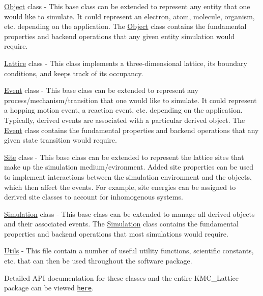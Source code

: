 \hyperlink{class_object}{Object} class -\/ This base class can be extended to represent any entity that one would like to simulate. It could represent an electron, atom, molecule, organism, etc. depending on the application. The \hyperlink{class_object}{Object} class contains the fundamental properties and backend operations that any given entity simulation would require.

\hyperlink{class_lattice}{Lattice} class -\/ This class implements a three-\/dimensional lattice, its boundary conditions, and keeps track of its occupancy.

\hyperlink{class_event}{Event} class -\/ This base class can be extended to represent any process/mechanism/transition that one would like to simulate. It could represent a hopping motion event, a reaction event, etc. depending on the application. Typically, derived events are associated with a particular derived object. The \hyperlink{class_event}{Event} class contains the fundamental properties and backend operations that any given state transition would require.

\hyperlink{class_site}{Site} class -\/ This base class can be extended to represent the lattice sites that make up the simulation medium/evironment. Added site properties can be used to implement interactions between the simulation environment and the objects, which then affect the events. For example, site energies can be assigned to derived site classes to account for inhomogenous systems.

\hyperlink{class_simulation}{Simulation} class -\/ This base class can be extended to manage all derived objects and their associated events. The \hyperlink{class_simulation}{Simulation} class contains the fundamental properties and backend operations that most simulations would require.

\hyperlink{namespace_utils}{Utils} -\/ This file contain a number of useful utility functions, scientific constants, etc. that can then be used throughout the software package.

Detailed A\+PI documentation for these classes and the entire K\+M\+C\+\_\+\+Lattice package can be viewed \href{https://mikeheiber.github.io/KMC_Lattice/}{\tt here}. 
